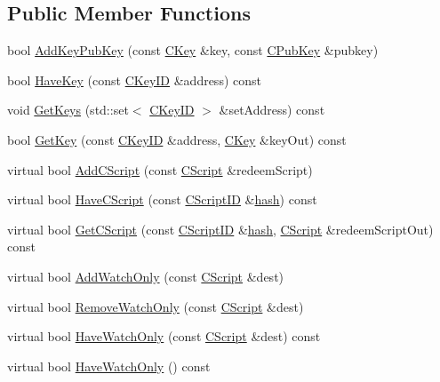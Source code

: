 \subsection*{Public Member Functions}
\begin{DoxyCompactItemize}
\item 
bool \hyperlink{class_c_basic_key_store_acc2e33f319de88e88f86b0dc79bdcb65}{Add\+Key\+Pub\+Key} (const \hyperlink{class_c_key}{C\+Key} \&key, const \hyperlink{class_c_pub_key}{C\+Pub\+Key} \&pubkey)
\item 
bool \hyperlink{class_c_basic_key_store_a29a60832d549913b1fa8be77b95205a5}{Have\+Key} (const \hyperlink{class_c_key_i_d}{C\+Key\+I\+D} \&address) const 
\item 
void \hyperlink{class_c_basic_key_store_a60f46db5eec334d41e5ad6e342ae2957}{Get\+Keys} (std\+::set$<$ \hyperlink{class_c_key_i_d}{C\+Key\+I\+D} $>$ \&set\+Address) const 
\item 
bool \hyperlink{class_c_basic_key_store_a3cf9b5d002a8af75e7f90ae7654a234f}{Get\+Key} (const \hyperlink{class_c_key_i_d}{C\+Key\+I\+D} \&address, \hyperlink{class_c_key}{C\+Key} \&key\+Out) const 
\item 
virtual bool \hyperlink{class_c_basic_key_store_a56249ce3540398999cd397eeb662e836}{Add\+C\+Script} (const \hyperlink{class_c_script}{C\+Script} \&redeem\+Script)
\item 
virtual bool \hyperlink{class_c_basic_key_store_a2e21398364927d920b15d3e10171cd97}{Have\+C\+Script} (const \hyperlink{class_c_script_i_d}{C\+Script\+I\+D} \&\hyperlink{cache_8cc_a11ecb029164e055f28f4123ce3748862}{hash}) const 
\item 
virtual bool \hyperlink{class_c_basic_key_store_aa7b10f974cfdc078f55fdb6adf8774a5}{Get\+C\+Script} (const \hyperlink{class_c_script_i_d}{C\+Script\+I\+D} \&\hyperlink{cache_8cc_a11ecb029164e055f28f4123ce3748862}{hash}, \hyperlink{class_c_script}{C\+Script} \&redeem\+Script\+Out) const 
\item 
virtual bool \hyperlink{class_c_basic_key_store_a2417d0ae4e654c88cf47a1ba5f71b5a3}{Add\+Watch\+Only} (const \hyperlink{class_c_script}{C\+Script} \&dest)
\item 
virtual bool \hyperlink{class_c_basic_key_store_a20c0eccf943d6d16e24c6e2fb63fb527}{Remove\+Watch\+Only} (const \hyperlink{class_c_script}{C\+Script} \&dest)
\item 
virtual bool \hyperlink{class_c_basic_key_store_a51d4c7e95cb782d749939d01612926f7}{Have\+Watch\+Only} (const \hyperlink{class_c_script}{C\+Script} \&dest) const 
\item 
virtual bool \hyperlink{class_c_basic_key_store_a3d89af8d9e9e0bb4eb90f331a638ff6d}{Have\+Watch\+Only} () const 
\end{DoxyCompactItemize}
